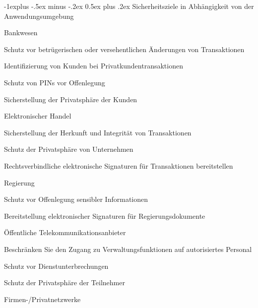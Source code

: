 \documentclass[a4paper]{article}
\makeatletter
\renewcommand{\subsection}{\@startsection{subsection}{2}{0mm}%
 {-1explus -.5ex minus -.2ex}%
 {0.5ex plus .2ex}%
 {\normalfont\normalsize\bfseries}}
\makeatother
\begin{document}
\begin{multicols}{3}
      \subsection{Sicherheitsziele in Abhängigkeit von der
            Anwendungsumgebung}

      \begin{itemize*}
            \item
            Bankwesen

            \begin{itemize*}
                  \item Schutz vor betrügerischen oder versehentlichen Änderungen von Transaktionen
                  \item Identifizierung von Kunden bei Privatkundentransaktionen
                  \item Schutz von PINs vor Offenlegung
                  \item Sicherstellung der Privatsphäre der Kunden
            \end{itemize*}
            \item
            Elektronischer Handel

            \begin{itemize*}
                  \item Sicherstellung der Herkunft und Integrität von Transaktionen
                  \item Schutz der Privatsphäre von Unternehmen
                  \item Rechtsverbindliche elektronische Signaturen für Transaktionen bereitstellen
            \end{itemize*}
            \item
            Regierung

            \begin{itemize*}
                  \item Schutz vor Offenlegung sensibler Informationen
                  \item Bereitstellung elektronischer Signaturen für Regierungsdokumente
            \end{itemize*}
            \item
            Öffentliche Telekommunikationsanbieter

            \begin{itemize*}
                  \item Beschränken Sie den Zugang zu Verwaltungsfunktionen auf autorisiertes Personal
                  \item Schutz vor Dienstunterbrechungen
                  \item Schutz der Privatsphäre der Teilnehmer
            \end{itemize*}
            \item
            Firmen-/Privatnetzwerke


\end{itemize*}
\end{multicols}
\end{document}
